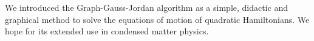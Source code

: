 \documentclass[showpacs,aps,prb,reprint,superscriptaddress]{revtex4-2}
\begin{document}
We introduced the Graph-Gauss-Jordan algorithm as a simple, didactic and graphical method to solve the equations of motion of quadratic Hamiltonians. We hope for its extended use in condensed matter physics.



%
%

\end{document}
